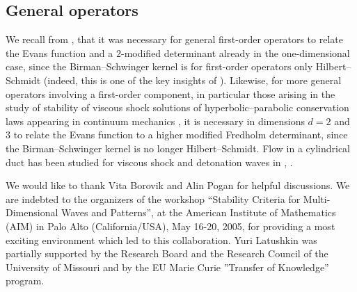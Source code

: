 \subsection{General operators}\label{general}
We recall from \cite{GLM07}, that it was necessary for general first-order
operators to relate the Evans function and a $2$-modified determinant
already in the one-dimensional case, since the Birman--Schwinger
kernel is for first-order operators only Hilbert--Schmidt
(indeed, this is one of the key insights of \cite{GLM07}).
Likewise, for more general operators involving a first-order component,
in particular those arising
in the study of stability of viscous shock solutions of
hyperbolic--parabolic conservation laws appearing in continuum mechanics
\cite{Zu03}, it is necessary in dimensions $d=2$ and $3$ to relate
the Evans function to a higher modified Fredholm determinant, since the
Birman--Schwinger kernel is no longer Hilbert--Schmidt. 
Flow in a cylindrical duct has been studied for viscous shock
and detonation waves in \cite{TZ06}, \cite{TZ07}.

\bigskip
{}
We would like to thank Vita Borovik and Alin Pogan for helpful discussions.
We are indebted to the organizers of the workshop ``Stability
Criteria for Multi-Dimensional Waves and Patterns'', at the American
Institute of
Mathematics (AIM) in Palo Alto (California/USA), May 16-20, 2005, for
providing a most exciting environment which led to this collaboration.
Yuri Latushkin was partially supported by the
 Research Board and the Research Council
 of the University of
 Missouri and by the EU Marie Curie
 ''Transfer of Knowledge'' program.

